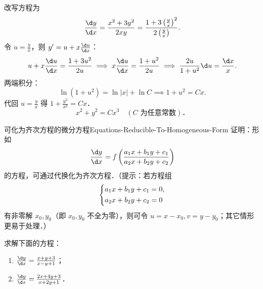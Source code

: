 \begin{solution}
    改写方程为
    \begin{equation}
        \frac{\d y}{\d x} = \frac{x^2 + 3y^2}{2xy} = \frac{1 + 3\left(\frac{y}{x}\right)^2}{2\left(\frac{y}{x}\right)}.
    \end{equation}
    令 $u = \frac{y}{x}$，则 $y' = u + x \frac{\d u}{\d x}$：
    \begin{equation}
        u + x \frac{\d u}{\d x} = \frac{1 + 3u^2}{2u} \implies x \frac{\d u}{\d x} = \frac{1 + u^2}{2u} \implies \frac{2u}{1 + u^2}\d u = \frac{\d x}{x}.
    \end{equation}
    两端积分：
    \begin{equation}
        \ln(1 + u^2) = \ln|x| + \ln C \implies 1 + u^2 = Cx.
    \end{equation}
    代回 $u = \frac{y}{x}$ 得 $1 + \frac{y^2}{x^2} = Cx$．
    \begin{equation}
        \boxed{x^2 + y^2 = C x^3 \quad (C \text{ 为任意常数})．}
    \end{equation}
\end{solution}

\begin{problem}{可化为齐次方程的微分方程}{Equations-Reducible-To-Homogeneous-Form}
    证明：形如
    \begin{equation}
        \frac{\d y}{\d x} = f\left(\frac{a_1 x + b_1 y + c_1}{a_2 x + b_2 y + c_2}\right)
    \end{equation}
    的方程，可通过代换化为齐次方程．（提示：若方程组
    \begin{equation}
        \begin{dcases}
            a_1 x + b_1 y + c_1 = 0, \\
            a_2 x + b_2 y + c_2 = 0
        \end{dcases}
    \end{equation}
    有非零解 $x_0, y_0$（即 $x_0, y_0$ 不全为零），则可令 $u = x - x_0, v = y - y_0$；其它情形更易于处理．）

    求解下面的方程：
    \begin{enumerate}
        \item $\frac{\d y}{\d x} = \frac{x+y+3}{x-y+1}$；
        \item $\frac{\d y}{\d x} = \frac{2x+4y+3}{x+2y+1}$．
    \end{enumerate}
\end{problem}

